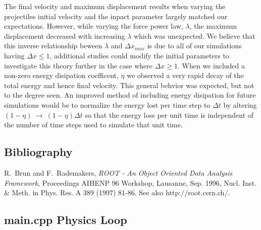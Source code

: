 \documentclass[aps,prl,floatfix,preprint,nofootinbib]{revtex4}
\begin{document}
The final velocity and maximum displacement results when varying the projectiles initial velocity and the inpact parameter largely matched our expectations. However, while varying the force power law, $\lambda$, the maximum displacement decreased with increasing $\lambda$ which was unexpected. We believe that this inverse relationship beween $\lambda$ and $\Delta x_{max}$ is due to all of our simulations having $\Delta x \leq 1$, additional studies could modify the initial parameters to investigate this theory further in the case where $\Delta x \geq 1$. When we included a non-zero energy disipation coefficent, $\eta$ we observed a very rapid decay of the total energy and hence final velocity. This general behvior was expected, but not to the degree seen. An improved method of including energy disipation for future simulations would be to normalize the energy lost per time step to $\Delta t$ by altering $\left(1-\eta\right)~\rightarrow~\left(1-\eta\right)\Delta t$ so that the energy loss per unit time is independent of the number of time steps used to simulate that unit time. 

\clearpage
\begin{thebibliography}{9}
  \section{Bibliography}
  R.~Brun and F.~Rademakers, \emph{ROOT - An Object Oriented Data Analysis Framework}, Proceedings AIHENP 96 Workshop, Lausanne, Sep. 1996, Nucl. Inst. \& Meth. in Phys. Res. A 389 (1997) 81-86. See also http://root.cern.ch/.

\end{thebibliography}

\clearpage
\begin{appendices}
  \singlespacing
  \section{main.cpp Physics Loop} \label{sec:main.cpp}

\end{appendices}
\end{document}
